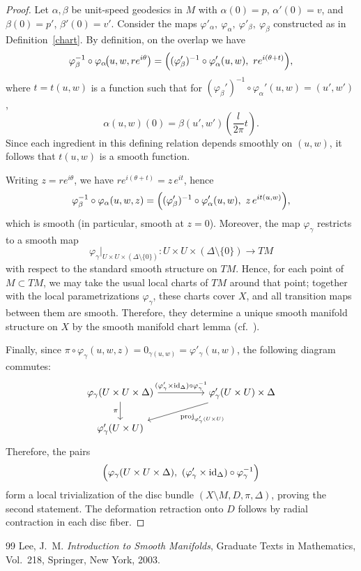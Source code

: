 \documentclass[10pt,a4paper]{amsart}
\begin{document}
\begin{proof}
Let $\alpha,\beta$ be unit-speed geodesics in $M$ with $\alpha(0)=p$, $\alpha'(0)=v$, and $\beta(0)=p'$, $\beta'(0)=v'$. Consider the maps $\varphi'_\alpha,~\varphi_\alpha,~\varphi'_\beta,~\varphi_\beta$ constructed as in Definition~\ref{chart}. By definition, on the overlap we have
\[
\varphi_\beta^{-1}\circ \varphi_\alpha\!\bigl(u,w,re^{i\theta}\bigr)
=
\Bigl((\varphi_\beta')^{-1}\circ \varphi_\alpha'(u,w),\ re^{i(\theta+t)}\Bigr),
\]
where $t=t(u,w)$ is a function such that for $(\varphi_\beta')^{-1}\circ \varphi_\alpha'(u,w)=(u',w')$,
\[
\alpha(u,w)(0)=\beta(u',w')\left(\dfrac{l}{2\pi}t\right). 
\]
Since each ingredient in this defining relation depends smoothly on $(u,w)$, it follows that $t(u,w)$ is a smooth function.

Writing $z=re^{i\theta}$, we have $re^{i(\theta+t)}=z\,e^{it}$, hence
\[
\varphi_\beta^{-1}\circ \varphi_\alpha(u,w,z)
=
\Bigl((\varphi_\beta')^{-1}\circ \varphi_\alpha'(u,w),\ z\,e^{i t(u,w)}\Bigr),
\]
which is smooth (in particular, smooth at $z=0$). Moreover, the map $\varphi_\gamma$ restricts to a smooth map
\[
\varphi_\gamma\big|_{U\times U\times (\Delta\setminus\{0\})}\colon U\times U\times (\Delta\setminus\{0\})\longrightarrow TM
\]
with respect to the standard smooth structure on $TM$. Hence, for each point of $M\subset TM$, we may take the usual local charts of $TM$ around that point; together with the local parametrizations $\varphi_\gamma$, these charts cover $X$, and all transition maps between them are smooth. Therefore, they determine a unique smooth manifold structure on $X$ by the smooth manifold chart lemma (cf.~\cite[Lemma~1.35]{L03}).

Finally, since $\pi\circ\varphi_\gamma(u,w,z)=0_{\gamma(u,w)}=\varphi'_\gamma(u,w)$, the following diagram commutes:
\[
\begin{tikzcd}[column sep=huge]
\varphi_\gamma(U\times U\times \Delta)
  \arrow[r, "(\varphi'_\gamma\times \mathrm{id}_{\Delta})\circ \varphi_\gamma^{-1}"]
  \arrow[d, "\pi"']
&
\varphi'_\gamma(U\times U)\times \Delta
  \arrow[dl, "\mathrm{proj}_{\varphi'_\gamma(U\times U)}"]
\\
\varphi'_\gamma(U\times U) &
\end{tikzcd}
\]
Therefore, the pairs
\[
\Bigl(\varphi_\gamma(U\times U\times \Delta),\ (\varphi'_\gamma\times \mathrm{id}_{\Delta})\circ \varphi_\gamma^{-1}\Bigr)
\]
form a local trivialization of the disc bundle $(X\setminus M, D, \pi, \Delta)$, proving the second statement. The deformation retraction onto $D$ follows by radial contraction in each disc fiber.
\end{proof}

\begin{thebibliography}{99}
 Lee, J.~M. \emph{Introduction to Smooth Manifolds}, Graduate Texts in Mathematics, Vol.~218, Springer, New York, 2003.
\end{thebibliography}
\end{document}
